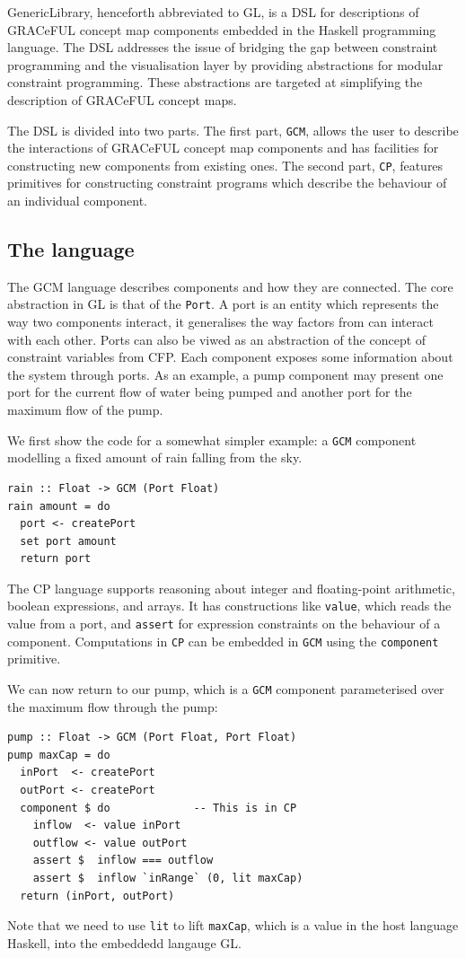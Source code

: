 GenericLibrary, henceforth abbreviated to GL, is a DSL for
descriptions of GRACeFUL concept map components embedded in the
Haskell programming language.
%
The DSL addresses the issue of bridging the gap between constraint
programming and the visualisation layer by providing abstractions for
modular constraint programming.
%
These abstractions are targeted at simplifying the description of
GRACeFUL concept maps.

The DSL is divided into two parts.
%
The first part, \texttt{GCM}, allows the user to describe the
interactions of GRACeFUL concept map components and has facilities for
constructing new components from existing ones.
%
The second part, \texttt{CP}, features primitives for constructing
constraint programs which describe the behaviour of an individual
component.

\subsection{The language}

The GCM language describes components and how they are connected.
%
The core abstraction in GL is that of the \texttt{Port}.
%
A port is an entity which represents the way two components interact,
it generalises the way factors from \cite{D4.1} can interact with each
other. Ports can also be viwed as an abstraction of the concept of
constraint variables from CFP.
%
Each component exposes some information about the system through
ports.
%
As an example, a pump component may present one port for the current
flow of water being pumped and another port for the maximum flow of
the pump.

We first show the code for a somewhat simpler example: a \texttt{GCM}
component modelling a fixed amount of rain falling from the sky.
\begin{verbatim}
rain :: Float -> GCM (Port Float)
rain amount = do
  port <- createPort
  set port amount
  return port
\end{verbatim}

The CP language supports reasoning about integer and floating-point
arithmetic, boolean expressions, and arrays.
%
It has constructions like \texttt{value}, which reads the value from a
port, and \texttt{assert} for expression constraints on the behaviour
of a component.
%
Computations in \texttt{CP} can be embedded in \texttt{GCM} using the
\texttt{component} primitive.

We can now return to our pump, which is a \texttt{GCM} component
parameterised over the maximum flow through the pump:
%
\begin{verbatim}
pump :: Float -> GCM (Port Float, Port Float)
pump maxCap = do
  inPort  <- createPort
  outPort <- createPort
  component $ do             -- This is in CP
    inflow  <- value inPort
    outflow <- value outPort
    assert $  inflow === outflow
    assert $  inflow `inRange` (0, lit maxCap)
  return (inPort, outPort)
\end{verbatim}
%
Note that we need to use \texttt{lit} to lift \texttt{maxCap}, which
is a value in the host language Haskell, into the embeddedd langauge
GL.

